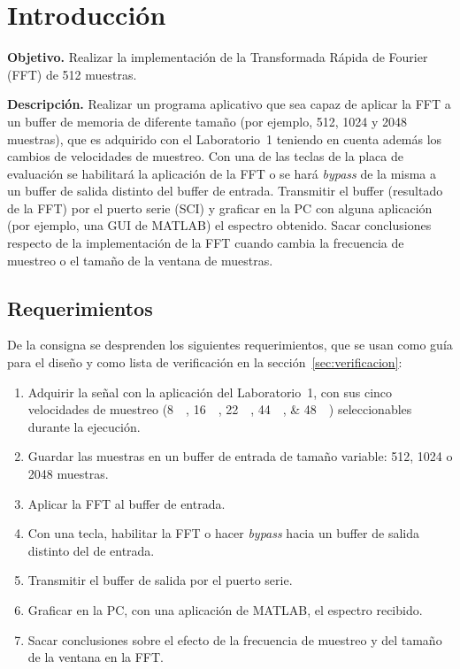 \documentclass[11pt,a4paper]{article}
\begin{document}
\caratula
\setcounter{tocdepth}{2}
\tableofcontents
\clearpage

\section{Introducción}

\begin{consigna}
\textbf{Objetivo.} Realizar la implementación de la Transformada Rápida de
Fourier (FFT) de 512 muestras.

\textbf{Descripción.} Realizar un programa aplicativo que sea capaz de aplicar
la FFT a un buffer de memoria de diferente tamaño (por ejemplo, 512, 1024 y
2048 muestras), que es adquirido con el Laboratorio~1 teniendo en cuenta
además los cambios de velocidades de muestreo. Con una de las teclas de la
placa de evaluación se habilitará la aplicación de la FFT o se hará
\emph{bypass} de la misma a un buffer de salida distinto del buffer de
entrada. Transmitir el buffer (resultado de la FFT) por el puerto serie (SCI)
y graficar en la PC con alguna aplicación (por ejemplo, una GUI de MATLAB) el
espectro obtenido. Sacar conclusiones respecto de la implementación de la FFT
cuando cambia la frecuencia de muestreo o el tamaño de la ventana de
muestras.
\end{consigna}

\subsection{Requerimientos}

De la consigna se desprenden los siguientes requerimientos, que se usan como
guía para el diseño y como lista de verificación en la
sección~\ref{sec:verificacion}:

\begin{enumerate}[label=\textbf{R\arabic*},leftmargin=2.2em]
  \item \label{req:fs} Adquirir la señal con la aplicación del
        Laboratorio~1, con sus cinco velocidades de muestreo
        (\qtylist{8;16;22;44;48}{\kilo\sps}) seleccionables durante la
        ejecución.
  \item \label{req:n} Guardar las muestras en un buffer de entrada de
        tamaño variable: 512, 1024 o 2048 muestras.
  \item \label{req:fft} Aplicar la FFT al buffer de entrada.
  \item \label{req:tecla} Con una tecla, habilitar la FFT o hacer
        \emph{bypass} hacia un buffer de salida distinto del de entrada.
  \item \label{req:sci} Transmitir el buffer de salida por el puerto serie.
  \item \label{req:gui} Graficar en la PC, con una aplicación de MATLAB, el
        espectro recibido.
  \item \label{req:concl} Sacar conclusiones sobre el efecto de la frecuencia
        de muestreo y del tamaño de la ventana en la FFT.
\end{enumerate}
\end{document}
